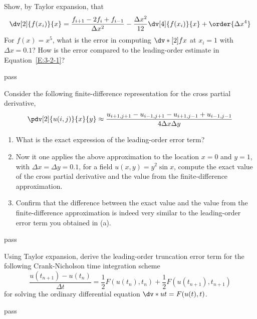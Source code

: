 \begin{homework}[label={H:3-2}]
    Show, by Taylor expansion, that
    \begin{equation}\label{E:3-2-1}
        \dv[2]{f(x_i)}{x} = \frac{f_{i+1}-2f_i+f_{i-1}}{\Delta x^2} - \frac{\Delta x^2}{12}\dv[4]{f(x_i)}{x} + \order{\Delta x^4}
    \end{equation}
    For $f(x)=x^5$,  what is the error in computing $\dv*[2]{f}{x}$ at $x_i=1$ with $\Delta x=0.1$? How 
    is the error compared to the leading-order estimate in Equation~\eqref{E:3-2-1}?
\end{homework}

pass



\begin{homework}[label={H:3-3}]
    Consider the following finite-difference representation for the cross partial derivative,
    \begin{equation}\label{E:3-3-1}
        \pdv[2]{u(i, j)}{x}{y} \approx \frac{u_{i+1, j+1} - u_{i-1, j+1} - u_{i+1, j-1} + u_{i-1, j-1}}{4\Delta x\Delta y}
    \end{equation}

    \begin{enumerate}[label=(\alph*)]
        \item What is the exact expression of the leading-order error term?
        \item Now it one applies the above approximation to the location $x=0$ and $y=1$, with $\Delta x=\Delta y=0.1$, for a field $u(x, y)=y^2\sin x$, compute the exact value of the cross partial derivative and the value from the finite-difference approximation.
        \item Confirm that the difference between the exact value and the value from the finite-difference approximation is indeed very similar to the leading-order error term you obtained in (a).
    \end{enumerate}
\end{homework}

pass



\begin{homework}[label={H:3-4}]
    Using Taylor expansion, derive the leading-order truncation error term for the following Crank-Nicholson time integration scheme
    \begin{equation}\label{E:3-4-1}
        \frac{u(t_{n+1})-u(t_n)}{\Delta t} = \frac{1}{2}F(u(t_n), t_n) + \frac{1}{2}F(u(t_{n+1}), t_{n+1})
    \end{equation}
    for solving the ordinary differential equation $\dv*{u}{t}=F(u(t), t)$.
\end{homework}

pass
